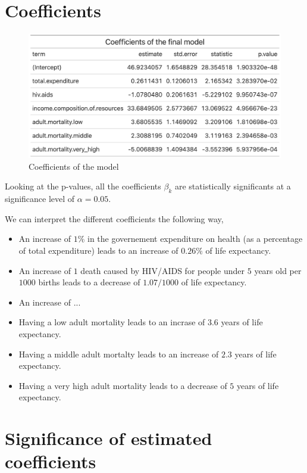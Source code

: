 \section{Coefficients}

\begin{figure}[H]
	\centering
	\includegraphics{figures/coefficients/coeff-model.png}
	\caption{Coefficients of the model}
	\label{fig:coeff-model}
\end{figure}

Looking at the p-values, all the coefficients $\beta_k$ are statistically significants at a significance level of $\alpha = 0.05$.

We can interpret the different coefficients the following way,
\begin{itemize}
	\item An increase of $1\%$ in the governement expenditure on health (as a percentage of total expenditure) leads to an increase of $0.26\%$ of life expectancy.
	\item An increase of $1$ death caused by HIV/AIDS for people under $5$ years old per $1000$ births leads to a decrease of $1.07/1000$ of life expectancy.
	\item An increase of ...
	\item Having a low adult mortality leads to an incrase of $3.6$ years of life expectancy.
	\item Having a middle adult mortalty leads to an increase of $2.3$ years of life expectancy.
	\item Having a very high adult mortality leads to a decrease of $5$ years of life expectancy.
\end{itemize}


\section{Significance of estimated coefficients}

